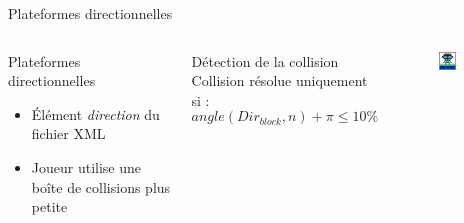 \documentclass{beamer}
\begin{document}
{\begin{frame}{Plateformes directionnelles}
    \begin{columns}
            \begin{block}{Plateformes directionnelles}
                \begin{itemize}
                    \item[\bullet] Élément \emph{direction} du fichier XML
                    \item[\bullet] Joueur utilise une boîte de collisions plus petite
                \end{itemize}
            \end{block}
            \begin{block}{Détection de la collision}
                Collision résolue uniquement si :
                \[angle(Dir_{block},n) + \pi \le 10\%\]
            \end{block}
            \begin{figure}
                \centering
                \includegraphics[width=0.5\textwidth]{DirectionnalHB}
            \end{figure}
    \end{columns}
\end{frame}

}
\end{document}
